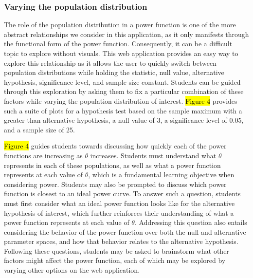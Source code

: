 \documentclass{TISE}
\begin{document}
\subsubsection{Varying the population distribution}

The role of the population distribution in a power function is one of the more abstract relationships we consider in this application, as it only manifests through the functional form of the power function. Consequently, it can be a difficult topic to explore without visuals. This web application provides an easy way to explore this relationship as it allows the user to quickly switch between population distributions while holding the statistic, null value, alternative hypothesis, significance level, and sample size constant. Students can be guided through this exploration by asking them to fix a particular combination of these factors while varying the population distribution of interest. \hl{Figure 4} provides such a suite of plots for a hypothesis test based on the sample maximum with a greater than alternative hypothesis, a null value of 3, a significance level of 0.05, and a sample size of 25.

\hl{Figure 4} guides students towards discussing how quickly each of the power functions are increasing as $\theta$ increases. Students must understand what $\theta$ represents in each of these populations, as well as what a power function represents at each value of $\theta$, which is a fundamental learning objective when considering power. Students may also be prompted to discuss which power function is closest to an ideal power curve. To answer such a question, students must first consider what an ideal power function looks like for the alternative hypothesis of interest, which further reinforces their understanding of what a power function represents at each value of $\theta$. Addressing this question also entails considering the behavior of the power function over both the null and alternative parameter spaces, and how that behavior relates to the alternative hypothesis. Following these questions, students may be asked to brainstorm what other factors might affect the power function, each of which may be explored by varying other options on the web application.
\end{document}
